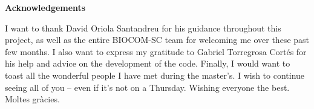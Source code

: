 
\thispagestyle{plain}                                   %

\null           %
\vspace{5cm}

\begin{center}
    {\Large\bfseries\sffamily  Acknowledgements}
\end{center}

\vspace{0.5em}

I want to thank David Oriola Santandreu for his guidance throughout this project, as well as the entire BIOCOM-SC team for welcoming me over these past few months. I also want to express my gratitude to Gabriel Torregrosa Cortés for his help and advice on the development of the code. Finally, I would want to toast all the wonderful people I have met during the master’s. I wish to continue seeing all of you -- even if it’s not on a Thursday. Wishing everyone the best. Moltes gràcies.

\restoregeometry
